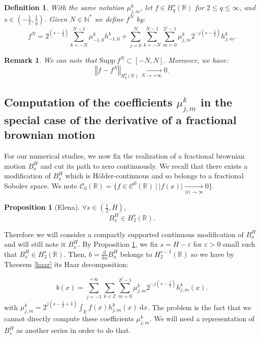 \documentclass[11pt]{enstaPRE}
\newtheorem{defi}{Definition}
\newtheorem{Pro}[theo]{Proposition}
\newtheorem{rem}{Remark}
\newcommand{\de}[2]{\frac{\mathrm{d} #1}{\mathrm{d} #2}}
\newcommand{\norme}[1]{\left\Vert #1\right\Vert}
\newcommand{\R}{\mathbb{R}}
\newcommand{\Z}{\mathbb{Z}}
\newcommand{\N}{\mathbb{N}}
\newcommand{\di}{\mathrm{d}}
\begin{document}
\begin{defi}
    With the same notation $\mu_{j,m}^k $, let $f\in H^s_q(\R)$ for $2\leq q \leq \infty$, and $s\in\left(-\frac{1}{2},\frac{1}{q}\right)$. Given $N\in\N^*$ we define $f^N$ by:
    \begin{equation}
    f^N = 2^{\left(s-\frac{1}{q}\right)}\sum_{k=-N}^{N-1}\mu_{-1,0}^kh_{-1,0}^k+\sum_{j=0}^{N}\sum_{k=-N}^{N-1}\sum_{m=0}^{2^j-1}\mu_{j,m}^k2^{-j\left(s-\frac{1}{q}\right)}h_{j,m}^k.
    \end{equation}
\end{defi}

\begin{rem}
    We can note that $\mathrm{Supp}\ f^N\subset [-N,N].$ Moreover, we have: $$\norme{f-f^N}_{H_q^s(\R)} \underset{N\rightarrow+\infty}{\longrightarrow} 0.$$
\end{rem}

\subsection{Computation of the coefficients $\mu_{j,m}^k$ in the special case of the derivative of a fractional brownian motion}

For our numerical studies, we now fix the realization of a fractional brownian motion $B^H_x$ and cut its path to zero continuously. We recall that there exists a modification of $B^H_x$ which is Hölder-continuous and so belongs to a fractional Sobolev space. We note $\mathcal{C}_0(\R)=\{f\in\mathcal{C}^0(\R)\ |\ |f(x)| \underset{|x|\rightarrow \infty}{\longrightarrow} 0\}$. 

\begin{Pro}[Elena]\label{elena}
    $\forall s\in\left(\frac{1}{2},H\right),$
    \begin{equation}
    B^H_x\in H^s_2(\R).
    \end{equation}
\end{Pro}

Therefore we will consider a compactly supported continuous modification of $B^H_x$ and will still note it $B^H_x$. By Proposition \ref{elena}, we fix $s=H-\varepsilon$ for $\varepsilon>0$ small such that $B^H_s\in H^s_2(\R)$. Then, $b=\de{}{u} B^H_u$ belongs to $H^{s-1}_2(\R)$ so we have by Theorem \ref{haar} its Haar decomposition:

\begin{equation}
b(x) = \sum_{j=-1}^{+\infty}\sum_{k\in\Z}\sum_{m=0}^{2^j-1}\mu_{j,m}^k2^{-j\left(s-\frac{1}{q}\right)}h_{j,m}^k(x).
\end{equation}
with $\mu_{j,m}^k = 2^{j\left(s-\frac{1}{q}+1\right)}\int_{\R}f(x)h_{j,m}^k(x)\ \di x$. The problem is the fact that we cannot directly compute these coefficients $\mu_{j,m}^k$. We will need a representation of $B^H_s$ as another series in order to do that.
\end{document}
